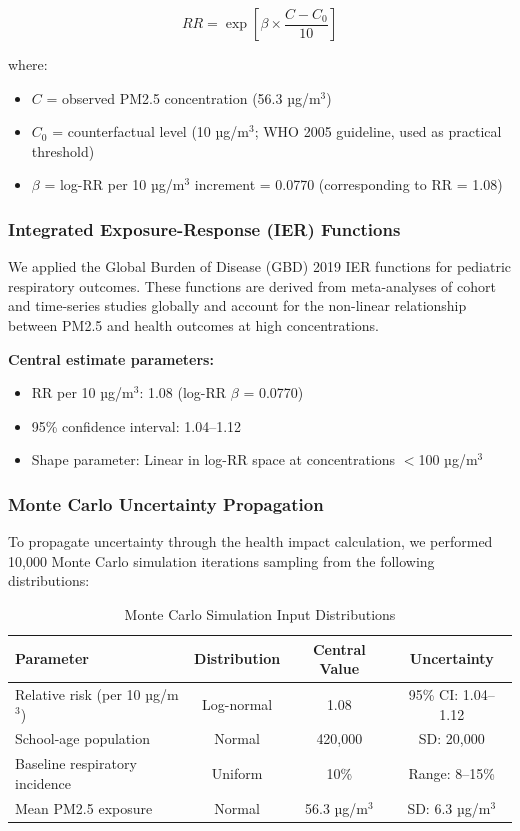 \documentclass[11pt,a4paper]{article}
\begin{document}
\begin{equation}
    RR = \exp\left[\beta \times \frac{C - C_0}{10}\right]
\end{equation}

where:
\begin{itemize}
    \item $C$ = observed PM2.5 concentration (56.3 µg/m$^3$)
    \item $C_0$ = counterfactual level (10 µg/m$^3$; WHO 2005 guideline, used as practical threshold)
    \item $\beta$ = log-RR per 10 µg/m$^3$ increment = 0.0770 (corresponding to RR = 1.08)
\end{itemize}

\subsubsection{Integrated Exposure-Response (IER) Functions}

We applied the Global Burden of Disease (GBD) 2019 IER functions for pediatric respiratory outcomes. These functions are derived from meta-analyses of cohort and time-series studies globally and account for the non-linear relationship between PM2.5 and health outcomes at high concentrations.

\textbf{Central estimate parameters:}
\begin{itemize}
    \item RR per 10 µg/m$^3$: 1.08 (log-RR $\beta$ = 0.0770)
    \item 95\% confidence interval: 1.04--1.12
    \item Shape parameter: Linear in log-RR space at concentrations $<$100 µg/m$^3$
\end{itemize}

\subsubsection{Monte Carlo Uncertainty Propagation}

To propagate uncertainty through the health impact calculation, we performed 10,000 Monte Carlo simulation iterations sampling from the following distributions:

\begin{table}[H]
\centering
\caption{Monte Carlo Simulation Input Distributions}
\begin{tabular}{lccc}
\toprule
Parameter & Distribution & Central Value & Uncertainty \\
\midrule
Relative risk (per 10 µg/m$^3$) & Log-normal & 1.08 & 95\% CI: 1.04--1.12 \\
School-age population & Normal & 420,000 & SD: 20,000 \\
Baseline respiratory incidence & Uniform & 10\% & Range: 8--15\% \\
Mean PM2.5 exposure & Normal & 56.3 µg/m$^3$ & SD: 6.3 µg/m$^3$ \\
\bottomrule
\end{tabular}
\end{table}
\end{document}
